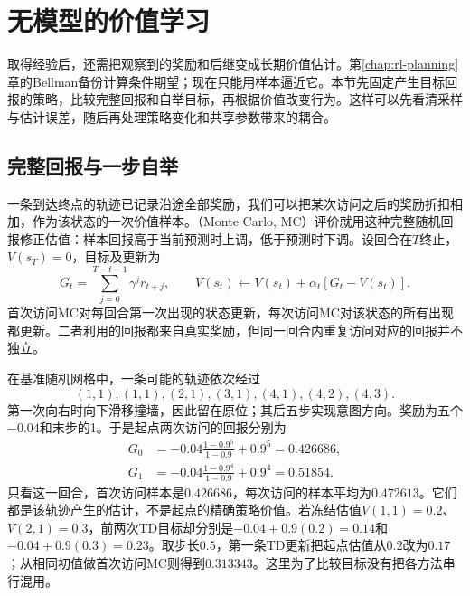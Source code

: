 \section{无模型的价值学习}
\label{sec:rl-learning-value}

取得经验后，还需把观察到的奖励和后继变成长期价值估计。第\ref{chap:rl-planning}章的Bellman备份计算条件期望；现在只能用样本逼近它。本节先固定产生目标回报的策略，比较完整回报和自举目标，再根据价值改变行为。这样可以先看清采样与估计误差，随后再处理策略变化和共享参数带来的耦合。

\subsection{完整回报与一步自举}
\label{sec:rl-learning-mc-td}

一条到达终点的轨迹已记录沿途全部奖励，我们可以把某次访问之后的奖励折扣相加，作为该状态的一次价值样本。（Monte Carlo, MC）评价就用这种完整随机回报修正估值：样本回报高于当前预测时上调，低于预测时下调。设回合在$T$终止，$V(s_T)=0$，目标及更新为
\begin{equation}
  G_t=\sum_{j=0}^{T-t-1}\gamma^j r_{t+j},
  \qquad
  V(s_t)\leftarrow V(s_t)+\alpha_t[G_t-V(s_t)].
  \label{eq:rl-learning-mc}
\end{equation}
首次访问MC对每回合第一次出现的状态更新，每次访问MC对该状态的所有出现都更新。二者利用的回报都来自真实奖励，但同一回合内重复访问对应的回报并不独立。

\begin{example}[同一终止轨迹上的不同目标]
  \label{ex:rl-learning-mc-td}
  在基准随机网格中，一条可能的轨迹依次经过
  \[
    (1,1),(1,1),(2,1),(3,1),(4,1),(4,2),(4,3).
  \]
  第一次向右时向下滑移撞墙，因此留在原位；其后五步实现意图方向。奖励为五个$-0.04$和末步的1。于是起点两次访问的回报分别为
  \[
    \begin{aligned}
      G_0&=-0.04\frac{1-0.9^5}{1-0.9}+0.9^5=0.426686,\\
      G_1&=-0.04\frac{1-0.9^4}{1-0.9}+0.9^4=0.51854.
    \end{aligned}
  \]
  只看这一回合，首次访问样本是$0.426686$，每次访问的样本平均为$0.472613$。它们都是该轨迹产生的估计，不是起点的精确策略价值。若冻结估值$V(1,1)=0.2$、$V(2,1)=0.3$，前两次TD目标却分别是$-0.04+0.9(0.2)=0.14$和$-0.04+0.9(0.3)=0.23$。取步长$0.5$，第一条TD更新把起点估值从$0.2$改为$0.17$；从相同初值做首次访问MC则得到$0.313343$。这里为了比较目标没有把各方法串行混用。
\end{example}

